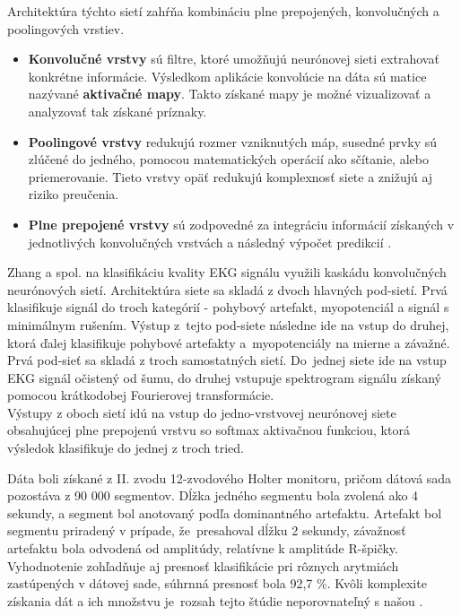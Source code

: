 \noindent Architektúra týchto sietí zahŕňa kombináciu plne prepojených, konvolučných a poolingových vrstiev.
\begin{itemize}
    \item \textbf{Konvolučné vrstvy} sú filtre, ktoré umožňujú neurónovej sieti extrahovať konkrétne informácie. Výsledkom aplikácie konvolúcie na dáta sú matice nazývané \textbf{aktivačné mapy}. Takto získané mapy je možné vizualizovať a analyzovať tak získané príznaky. 
    \item \textbf{Poolingové vrstvy} redukujú rozmer vzniknutých máp, susedné prvky sú zlúčené do jedného, pomocou matematických operácií ako sčítanie, alebo priemerovanie. Tieto vrstvy opäť redukujú komplexnosť siete a znižujú aj riziko preučenia.
    \item \textbf{Plne prepojené vrstvy} sú zodpovedné za integráciu informácií získaných v jednotlivých konvolučných vrstvách a následný výpočet predikcií \cite{Sakib2019}\cite{Aloysius2017}\cite{Albawi2017}.
\end{itemize}

Zhang a spol. \cite{Zhang2019} na klasifikáciu kvality EKG signálu využili kaskádu konvolučných neurónových sietí. Architektúra siete sa skladá z dvoch hlavných pod-sietí. Prvá klasifikuje signál do troch kategórií - pohybový artefakt, myopotenciál a signál s minimálnym rušením. Výstup z~tejto pod-siete následne ide na vstup do druhej, ktorá ďalej klasifikuje pohybové artefakty a~myopotenciály na mierne a závažné. Prvá pod-sieť sa skladá z troch samostatných sietí. Do~jednej siete ide na vstup EKG signál očistený od šumu, do druhej vstupuje spektrogram signálu získaný pomocou krátkodobej Fourierovej transformácie. \\Výstupy z oboch sietí idú na vstup do jedno-vrstvovej neurónovej siete obsahujúcej plne prepojenú vrstvu so softmax aktivačnou funkciou, ktorá výsledok klasifikuje do jednej z troch tried.

Dáta boli získané z II. zvodu 12-zvodového Holter monitoru, pričom dátová sada pozostáva z 90 000 segmentov. Dĺžka jedného segmentu bola zvolená ako 4 sekundy, a segment bol anotovaný podľa dominantného artefaktu. Artefakt bol segmentu priradený v prípade, že~presahoval dĺžku 2 sekundy, závažnosť artefaktu bola odvodená od amplitúdy, relatívne k amplitúde R-špičky. Vyhodnotenie zohľadňuje aj presnosť klasifikácie pri rôznych arytmiách zastúpených v dátovej sade, súhrnná presnosť bola 92,7 \%. Kvôli komplexite získania dát a ich množstvu je~rozsah tejto štúdie neporovnateľný s našou \cite{Zhang2019}.

